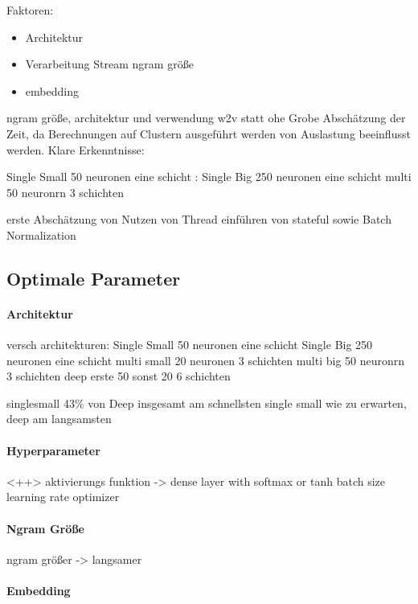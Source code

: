     Faktoren:
    \begin{itemize}
        \item Architektur
        \item Verarbeitung Stream
            \subitem ngram größe
        \item embedding
    \end{itemize}

    ngram größe, architektur und verwendung w2v statt ohe
    Grobe Abschätzung der Zeit, da Berechnungen auf Clustern ausgeführt werden von Auslastung beeinflusst werden.
    Klare Erkenntnisse:

        Single Small 50 neuronen eine schicht :
        Single Big 250 neuronen eine schicht
        multi 50 neuronrn 3 schichten

    erste Abschätzung von Nutzen von Thread 
    einführen von stateful sowie Batch Normalization

        


    \subsection{Optimale Parameter}

        \paragraph{Architektur}
        versch architekturen:
        Single Small 50 neuronen eine schicht
        Single Big 250 neuronen eine schicht
        multi small 20 neuronen 3 schichten
        multi big 50 neuronrn 3 schichten
        deep erste 50 sonst 20 6 schichten

        singlesmall 43\% von Deep
        insgesamt am schnellsten single small
        wie zu erwarten,  deep am langsamsten

\paragraph{Hyperparameter}<++>
    aktivierungs funktion
    -> dense layer with softmax or tanh
    batch size
    learning rate
    optimizer

\paragraph{Ngram Größe}
    ngram größer -> langsamer

\paragraph{Embedding}

